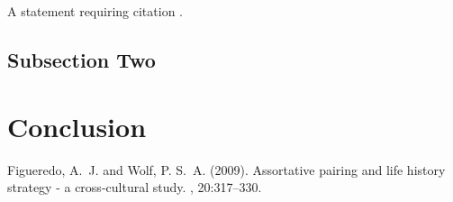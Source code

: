 \documentclass[twoside,twocolumn]{article}
\begin{document}
A statement requiring citation \cite{Figueredo:2009dg}.
\blindtext %

\subsection{Subsection Two}

\blindtext %

\section{Conclusion}



\begin{thebibliography}{99} %

	Figueredo, A.~J. and Wolf, P. S.~A. (2009).
	\newblock Assortative pairing and life history strategy - a cross-cultural
	study.
	, 20:317--330.

\end{thebibliography}

\end{document}

